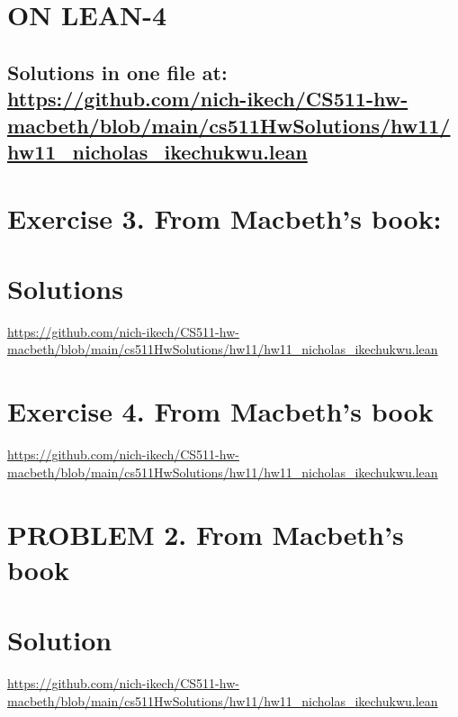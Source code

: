\documentclass{article}
\begin{document}
\newpage



\section*{ON LEAN-4}
\subsection*{Solutions in one file at: 
\url{https://github.com/nich-ikech/CS511-hw-macbeth/blob/main/cs511HwSolutions/hw11/hw11_nicholas_ikechukwu.lean}}

\newpage

\section*{Exercise 3. From Macbeth’s book:}
\section*{Solutions}
\url{https://github.com/nich-ikech/CS511-hw-macbeth/blob/main/cs511HwSolutions/hw11/hw11_nicholas_ikechukwu.lean}

\newpage

\section*{Exercise 4. From Macbeth's book}

\url{https://github.com/nich-ikech/CS511-hw-macbeth/blob/main/cs511HwSolutions/hw11/hw11_nicholas_ikechukwu.lean}

\newpage

\section*{PROBLEM 2. From Macbeth's book}
\section*{Solution}

\url{https://github.com/nich-ikech/CS511-hw-macbeth/blob/main/cs511HwSolutions/hw11/hw11_nicholas_ikechukwu.lean}
\end{document}
